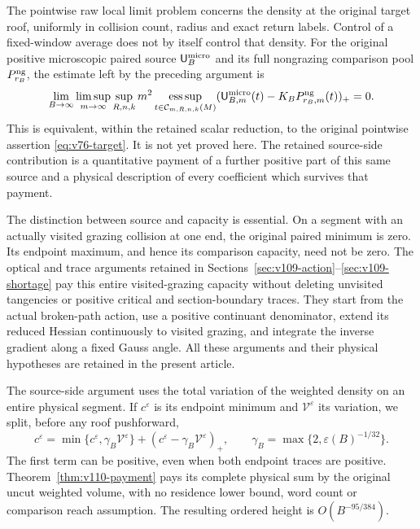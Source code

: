 \documentclass[11pt,reqno]{amsart}
\numberwithin{equation}{section}
\theoremstyle{definition}\newtheorem{definition}[theorem]{Definition}
\theoremstyle{remark}\newtheorem{remark}[theorem]{Remark}
\newcommand{\esssup}{\operatorname*{ess\,sup}}
\begin{document}
The pointwise raw local limit problem concerns the density at the
original target roof, uniformly in collision count, radius and exact
return labels. Control of a fixed-window average does not by itself
control that density. For the original positive microscopic paired
source $\mathsf U_B^{\rm micro}$ and its full nongrazing comparison
pool $P_{r_B}^{\rm ng}$, the estimate left by the preceding argument is
\begin{equation}\label{eq:v110-intro-original}
 \lim_{B\to\infty}\limsup_{m\to\infty}\sup_{R,n,k}m^2
 \esssup_{t\in\mathcal C_{m,R,n,k}(M)}
 (\mathsf U_{B,m}^{\rm micro}(t)
                      -K_BP_{r_B,m}^{\rm ng}(t))_+=0.
\end{equation}
This is equivalent, within the retained scalar reduction, to the
original pointwise assertion \eqref{eq:v76-target}. It is not yet
proved here. The retained source-side contribution is a quantitative payment of
a further positive part of this same source and a physical description
of every coefficient which survives that payment.

The distinction between source and capacity is essential. On a
segment with an actually visited grazing collision at one end, the
original paired minimum is zero. Its endpoint maximum, and hence its
comparison capacity, need not be zero. The optical and trace arguments
retained in Sections~\ref{sec:v109-action}--\ref{sec:v109-shortage}
pay this entire visited-grazing capacity without deleting unvisited
tangencies or positive critical and section-boundary traces.
They start from the actual broken-path action, use a positive
continuant denominator, extend its reduced Hessian continuously to
visited grazing, and integrate the inverse gradient along a fixed
Gauss angle. All these arguments and their physical hypotheses are
retained in the present article.

The source-side argument uses the total variation of the
weighted density on an entire physical segment. If $c^\varepsilon$
is its endpoint minimum and $\mathcal V^\varepsilon$ its variation,
we split, before any roof pushforward,
\[
 c^\varepsilon
   =\min\{c^\varepsilon,\gamma_B\mathcal V^\varepsilon\}
       +(c^\varepsilon-\gamma_B\mathcal V^\varepsilon)_+,
 \qquad \gamma_B=\max\{2,\varepsilon(B)^{-1/32}\}.
\]
The first term can be positive, even when both endpoint traces are
positive. Theorem~\ref{thm:v110-payment} pays its complete physical
sum by the original uncut weighted volume, with no residence lower
bound, word count or comparison reach assumption. The resulting
ordered height is $O(B^{-95/384})$.
\end{document}
